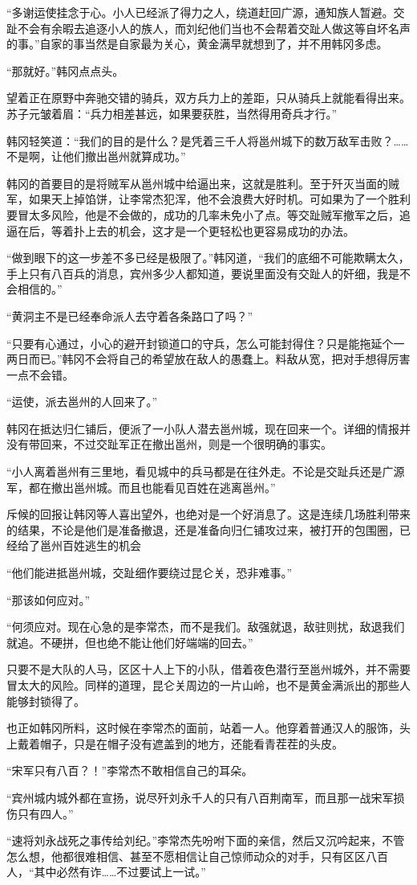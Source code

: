 “多谢运使挂念于心。小人已经派了得力之人，绕道赶回广源，通知族人暂避。交趾不会有余暇去追逐小人的族人，而刘纪他们当也不会帮着交趾人做这等自坏名声的事。”自家的事当然是自家最为关心，黄金满早就想到了，并不用韩冈多虑。

“那就好。”韩冈点点头。

望着正在原野中奔驰交错的骑兵，双方兵力上的差距，只从骑兵上就能看得出来。苏子元皱着眉：“兵力相差甚远，如果要获胜，当然得用奇兵才行。”

韩冈轻笑道：“我们的目的是什么？是凭着三千人将邕州城下的数万敌军击败？……不是啊，让他们撤出邕州就算成功。”

韩冈的首要目的是将贼军从邕州城中给逼出来，这就是胜利。至于歼灭当面的贼军，如果天上掉馅饼，让李常杰犯浑，他不会浪费大好时机。可如果为了一个胜利要冒太多风险，他是不会做的，成功的几率未免小了点。等交趾贼军撤军之后，追逼在后，等着扑上去的机会，这才是一个更轻松也更容易成功的办法。

“做到眼下的这一步差不多已经是极限了。”韩冈道，“我们的底细不可能欺瞒太久，手上只有八百兵的消息，宾州多少人都知道，要说里面没有交趾人的奸细，我是不会相信的。”

“黄洞主不是已经奉命派人去守着各条路口了吗？”

“只要有心通过，小心的避开封锁道口的守兵，怎么可能封得住？只是能拖延个一两日而已。”韩冈不会将自己的希望放在敌人的愚蠢上。料敌从宽，把对手想得厉害一点不会错。

“运使，派去邕州的人回来了。”

韩冈在抵达归仁铺后，便派了一小队人潜去邕州城，现在回来一个。详细的情报并没有带回来，不过交趾军正在撤出邕州，则是一个很明确的事实。

“小人离着邕州有三里地，看见城中的兵马都是在往外走。不论是交趾兵还是广源军，都在撤出邕州城。而且也能看见百姓在逃离邕州。”

斥候的回报让韩冈等人喜出望外，也绝对是一个好消息了。这是连续几场胜利带来的结果，不论是他们是准备撤退，还是准备向归仁铺攻过来，被打开的包围圈，已经给了邕州百姓逃生的机会

“他们能进抵邕州城，交趾细作要绕过昆仑关，恐非难事。”

“那该如何应对。”

“何须应对。现在心急的是李常杰，而不是我们。敌强就退，敌驻则扰，敌退我们就追。不硬拼，但也绝不能让他们好端端的回去。”

只要不是大队的人马，区区十人上下的小队，借着夜色潜行至邕州城外，并不需要冒太大的风险。同样的道理，昆仑关周边的一片山岭，也不是黄金满派出的那些人能够封锁得了。

也正如韩冈所料，这时候在李常杰的面前，站着一人。他穿着普通汉人的服饰，头上戴着帽子，只是在帽子没有遮盖到的地方，还能看青茬茬的头皮。

“宋军只有八百？！”李常杰不敢相信自己的耳朵。

“宾州城内城外都在宣扬，说尽歼刘永千人的只有八百荆南军，而且那一战宋军损伤只有四人。”

“速将刘永战死之事传给刘纪。”李常杰先吩咐下面的亲信，然后又沉吟起来，不管怎么想，他都很难相信、甚至不愿相信让自己惊师动众的对手，只有区区八百人，“其中必然有诈……不过要试上一试。”

